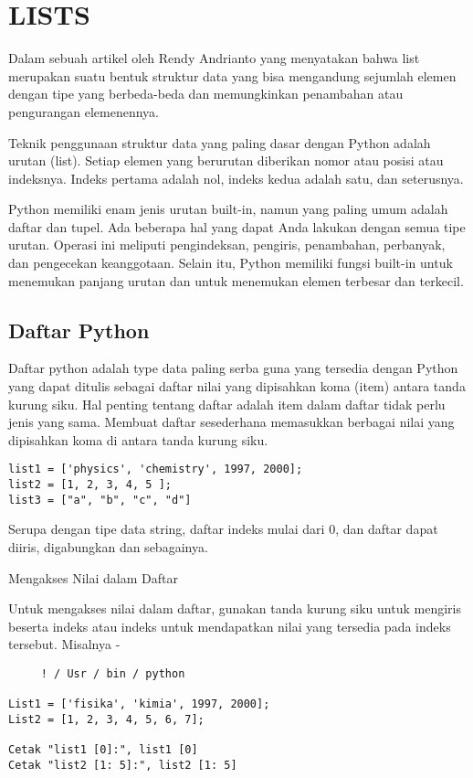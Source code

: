  
\section{LISTS}

Dalam sebuah artikel oleh Rendy Andrianto yang menyatakan bahwa list merupakan suatu bentuk struktur data yang bisa mengandung sejumlah elemen dengan tipe 
yang berbeda-beda dan memungkinkan penambahan atau pengurangan  elemenennya. \cite{andrianto2011aplikasi}

Teknik penggunaan struktur data yang paling dasar dengan Python adalah urutan (list). Setiap elemen yang berurutan diberikan nomor atau posisi atau indeksnya. 
Indeks pertama adalah nol, indeks kedua adalah satu, dan seterusnya.

Python memiliki enam jenis urutan built-in, namun yang paling umum adalah daftar dan tupel. Ada beberapa hal yang dapat Anda lakukan dengan semua tipe urutan.
Operasi ini meliputi pengindeksan, pengiris, penambahan, perbanyak, dan pengecekan keanggotaan. Selain itu, Python memiliki fungsi built-in untuk menemukan 
panjang urutan dan untuk menemukan elemen terbesar dan terkecil. 

\subsection{Daftar Python} 

Daftar python adalah type data paling serba guna yang tersedia dengan Python yang dapat ditulis sebagai daftar nilai yang dipisahkan koma (item) antara tanda 
kurung siku. Hal penting tentang daftar adalah item dalam daftar tidak perlu jenis yang sama. Membuat daftar sesederhana memasukkan berbagai nilai yang 
dipisahkan koma di antara tanda kurung siku. 

\begin{verbatim}
list1 = ['physics', 'chemistry', 1997, 2000]; 
list2 = [1, 2, 3, 4, 5 ]; 
list3 = ["a", "b", "c", "d"]
\end{verbatim} 

Serupa dengan tipe data string, daftar indeks mulai dari 0, dan daftar dapat diiris, digabungkan dan sebagainya.
 
Mengakses Nilai dalam Daftar 

Untuk mengakses nilai dalam daftar, gunakan tanda kurung siku untuk mengiris beserta indeks atau indeks untuk mendapatkan nilai yang tersedia pada indeks tersebut. Misalnya - 

\begin{verbatim}
     ! / Usr / bin / python 

List1 = ['fisika', 'kimia', 1997, 2000]; 
List2 = [1, 2, 3, 4, 5, 6, 7]; 

Cetak "list1 [0]:", list1 [0] 
Cetak "list2 [1: 5]:", list2 [1: 5] 
\end{verbatim}

